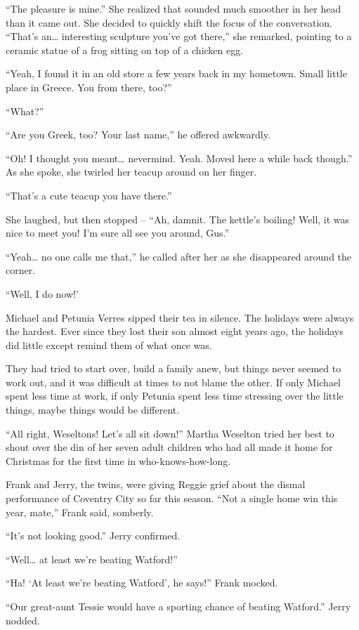 “The pleasure is mine.” She realized that sounded much smoother in her head than it came out. She decided to quickly shift the focus of the conversation. “That’s an… interesting sculpture you’ve got there,” she remarked, pointing to a ceramic statue of a frog sitting on top of a chicken egg.

“Yeah, I found it in an old store a few years back in my hometown. Small little place in Greece. You from there, too?”

“What?”

“Are you Greek, too? Your last name,” he offered awkwardly.

“Oh! I thought you meant… nevermind. Yeah. Moved here a while back though.” As she spoke, she twirled her teacup around on her finger.

“That’s a cute teacup you have there.”

She laughed, but then stopped – “Ah, damnit. The kettle’s boiling! Well, it was nice to meet you! I’m sure all see you around, Gus.”

“Yeah… no one calls me that,” he called after her as she disappeared around the corner.

“Well, I do now!’
\simpleline

Michael and Petunia Verres sipped their tea in silence. The holidays were always the hardest. Ever since they lost their son almost eight years ago, the holidays did little except remind them of what once was.

They had tried to start over, build a family anew, but things never seemed to work out, and it was difficult at times to not blame the other. If only Michael spent less time at work, if only Petunia spent less time stressing over the little things, maybe things would be different.
\simpleline

“All right, Weseltons! Let’s all sit down!” Martha Weselton tried her best to shout over the din of her seven adult children who had all made it home for Christmas for the first time in who-knows-how-long.

Frank and Jerry, the twins, were giving Reggie grief about the dismal performance of Coventry City so far this season. “Not a single home win this year, mate,” Frank said, somberly.

“It’s not looking good.” Jerry confirmed.

“Well… at least we’re beating Watford!”

“Ha! ‘At least we’re beating Watford’, he says!” Frank mocked.

“Our great-aunt Tessie would have a sporting chance of beating Watford.” Jerry nodded.

